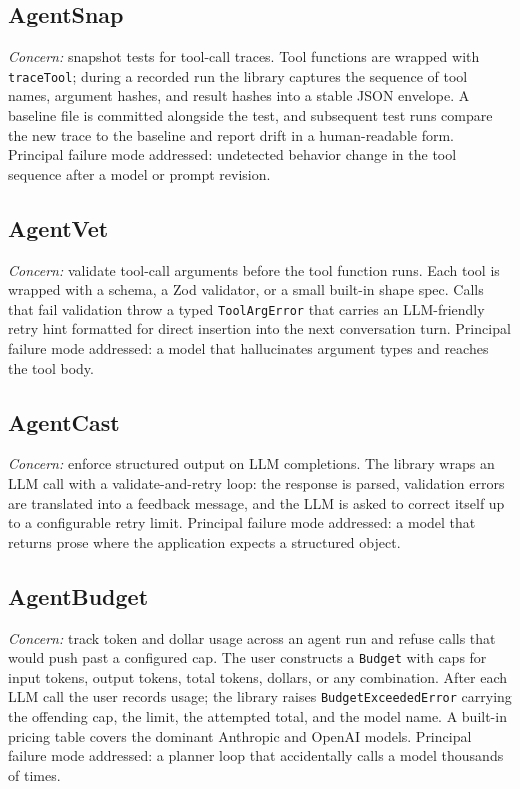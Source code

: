 \documentclass[sigconf,review]{acmart}
\begin{document}
\subsection{AgentSnap}
\textit{Concern:} snapshot tests for tool-call traces. Tool functions are wrapped with \texttt{traceTool}; during a recorded run the library captures the sequence of tool names, argument hashes, and result hashes into a stable JSON envelope. A baseline file is committed alongside the test, and subsequent test runs compare the new trace to the baseline and report drift in a human-readable form. Principal failure mode addressed: undetected behavior change in the tool sequence after a model or prompt revision.

\subsection{AgentVet}
\textit{Concern:} validate tool-call arguments before the tool function runs. Each tool is wrapped with a schema, a Zod validator, or a small built-in shape spec. Calls that fail validation throw a typed \texttt{ToolArgError} that carries an LLM-friendly retry hint formatted for direct insertion into the next conversation turn. Principal failure mode addressed: a model that hallucinates argument types and reaches the tool body.

\subsection{AgentCast}
\textit{Concern:} enforce structured output on LLM completions. The library wraps an LLM call with a validate-and-retry loop: the response is parsed, validation errors are translated into a feedback message, and the LLM is asked to correct itself up to a configurable retry limit. Principal failure mode addressed: a model that returns prose where the application expects a structured object.

\subsection{AgentBudget}
\textit{Concern:} track token and dollar usage across an agent run and refuse calls that would push past a configured cap. The user constructs a \texttt{Budget} with caps for input tokens, output tokens, total tokens, dollars, or any combination. After each LLM call the user records usage; the library raises \texttt{BudgetExceededError} carrying the offending cap, the limit, the attempted total, and the model name. A built-in pricing table covers the dominant Anthropic and OpenAI models. Principal failure mode addressed: a planner loop that accidentally calls a model thousands of times.
\end{document}
